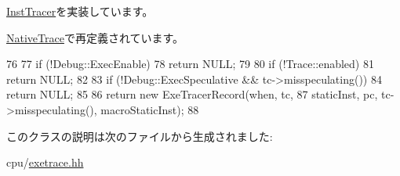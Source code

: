 \hyperlink{classTrace_1_1InstTracer_a4891aa2e596bcb475928d8fe1766a9df}{InstTracer}を実装しています。

\hyperlink{classTrace_1_1NativeTrace_ad520c1272aab137c3e207f526088843c}{NativeTrace}で再定義されています。


\begin{DoxyCode}
76     {
77         if (!Debug::ExecEnable)
78             return NULL;
79 
80         if (!Trace::enabled)
81             return NULL;
82 
83         if (!Debug::ExecSpeculative && tc->misspeculating())
84             return NULL;
85 
86         return new ExeTracerRecord(when, tc,
87                 staticInst, pc, tc->misspeculating(), macroStaticInst);
88     }
\end{DoxyCode}


このクラスの説明は次のファイルから生成されました:\begin{DoxyCompactItemize}
\item 
cpu/\hyperlink{exetrace_8hh}{exetrace.hh}\end{DoxyCompactItemize}

